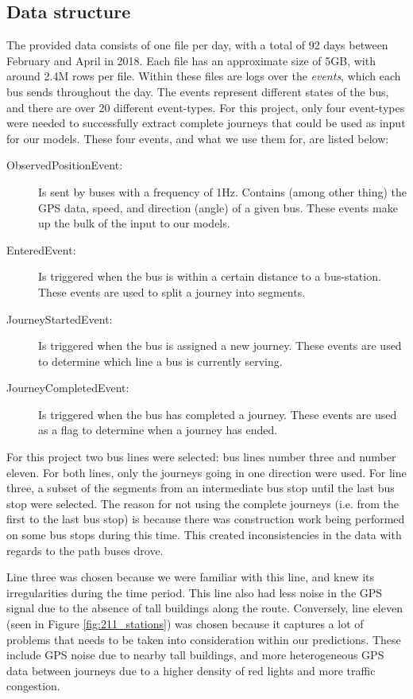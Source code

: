 \subsection{Data structure}
The provided data consists of one file per day, with a total of 92 days between February and April in 2018. Each file has an approximate size of 5GB, with around 2.4M rows per file. Within these files are logs over the \textit{events}, which each bus sends throughout the day. The events represent different states of the bus, and there are over 20 different event-types. For this project, only four event-types were needed to successfully extract complete journeys that could be used as input for our models. These four events, and what we use them for, are listed below:\\
\begin{description}
\item[ObservedPositionEvent:] Is sent by buses with a frequency of 1Hz. Contains (among other thing) the GPS data, speed, and direction (angle) of a given bus. These events make up the bulk of the input to our models.
\item[EnteredEvent:] Is triggered when the bus is within a certain distance to a bus-station. These events are used to split a journey into segments.
\item[JourneyStartedEvent:] Is triggered when the bus is assigned a new journey. These events are used to determine which line a bus is currently serving.
\item[JourneyCompletedEvent:] Is triggered when the bus has completed a journey. These events are used as a flag to determine when a journey has ended.
\end{description}

For this project two bus lines were selected: bus lines number three and number eleven. For both lines, only the journeys going in one direction were used. For line three, a subset of the segments from an intermediate bus stop until the last bus stop were selected. The reason for not using the complete journeys (i.e. from the first to the last bus stop) is because there was construction work being performed on some bus stops during this time. This created inconsistencies in the data with regards to the path buses drove. 

Line three was chosen because we were familiar with this line, and knew its irregularities during the time period. This line also had less noise in the GPS signal due to the absence of tall buildings along the route. Conversely, line eleven (seen in Figure \ref{fig:211_stations}) was chosen because it captures a lot of problems that needs to be taken into consideration within our predictions. These include GPS noise due to nearby tall buildings, and more heterogeneous GPS data between journeys due to a higher density of red lights and more traffic congestion.

